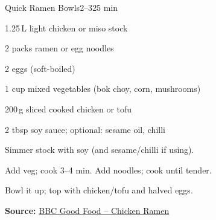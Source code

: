 \begin{recipebox}{Quick Ramen Bowls}{2--3}{25 min}
\begin{ingredients}
  \item 1.25\,L light chicken or miso stock
  \item 2 packs ramen or egg noodles
  \item 2 eggs (soft-boiled)
  \item 1 cup mixed vegetables (bok choy, corn, mushrooms)
  \item 200\,g sliced cooked chicken or tofu
  \item 2 tbsp soy sauce; optional: sesame oil, chilli
\end{ingredients}
\begin{method}
  \item Simmer stock with soy (and sesame/chilli if using).
  \item Add veg; cook 3--4 min. Add noodles; cook until tender.
  \item Bowl it up; top with chicken/tofu and halved eggs.
\end{method}
\textbf{Source:} \href{https://www.bbcgoodfood.com/recipes/chicken-ramen}{BBC Good Food – Chicken Ramen}
\end{recipebox}
